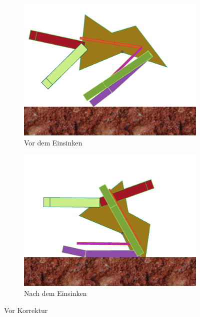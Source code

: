       \begin{figure}[H]
        \centering
        \begin{subfigure}[b]{0.45\textwidth}
          \includegraphics[width=\linewidth,center]{graphics/physics-engine/sink-0}
          \caption{Vor dem Einsinken\label{fig:vorEinsinken}}
        \end{subfigure}
        \qquad
        \begin{subfigure}[b]{0.45\textwidth}
          \includegraphics[width=\linewidth,center]{graphics/physics-engine/sink-1}
          \caption{Nach dem Einsinken\label{fig:nachEinsinken}}
        \end{subfigure}
        \caption{Vor Korrektur}
      \end{figure}

